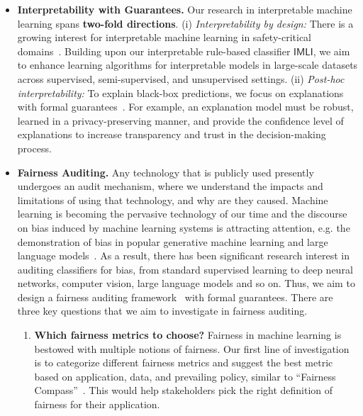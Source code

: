 \begin{itemize}
	
	
	\item \textbf{Interpretability with Guarantees.} Our research in interpretable machine learning spans \textbf{two-fold directions}.  (i) \textit{Interpretability by design:} There is a growing interest for interpretable machine learning in safety-critical domains~\cite{rudin2019stop}. Building upon our interpretable rule-based classifier $ \mathsf{IMLI} $, we aim to enhance learning algorithms for interpretable models in large-scale datasets across supervised, semi-supervised, and unsupervised settings. (ii) \textit{Post-hoc interpretability:} To explain black-box predictions, we focus on explanations with formal guarantees~\cite{ignatiev2019abduction,ribeiro2018anchors,guidotti2018local}. For example, an explanation model must be robust, learned in a privacy-preserving manner, and provide the confidence level of explanations to increase transparency and trust in the decision-making process.
	
	
	
		\item \textbf{Fairness Auditing.} Any technology that is publicly used presently undergoes an audit mechanism, where we understand the impacts and limitations of using that technology, and why are they caused. Machine learning is becoming the pervasive technology of our time and the discourse on bias induced by machine learning systems is attracting attention, e.g. the demonstration of bias in popular generative machine learning and large language models~\cite{abid2021persistent,nadeem2020stereoset,vig2020investigating}. As a result, there has been significant research interest in auditing classifiers for bias, from standard supervised learning to deep neural networks, computer vision, large language models and so on. Thus, we aim to design a fairness auditing framework~\cite{ruf2021towards,yan2022active} with formal guarantees.  There are three key questions that we aim to investigate in fairness auditing.
	
	\begin{enumerate}
		\item \textbf{Which fairness metrics to choose?} Fairness in machine learning is bestowed with multiple notions of fairness. Our first line of investigation is to categorize different fairness metrics  and suggest the best metric based on application, data, and prevailing policy, similar to ``Fairness Compass''~\cite{ruf2021towards}. This would help stakeholders pick the right definition of fairness for their application.
		

\end{enumerate}
\end{itemize}
